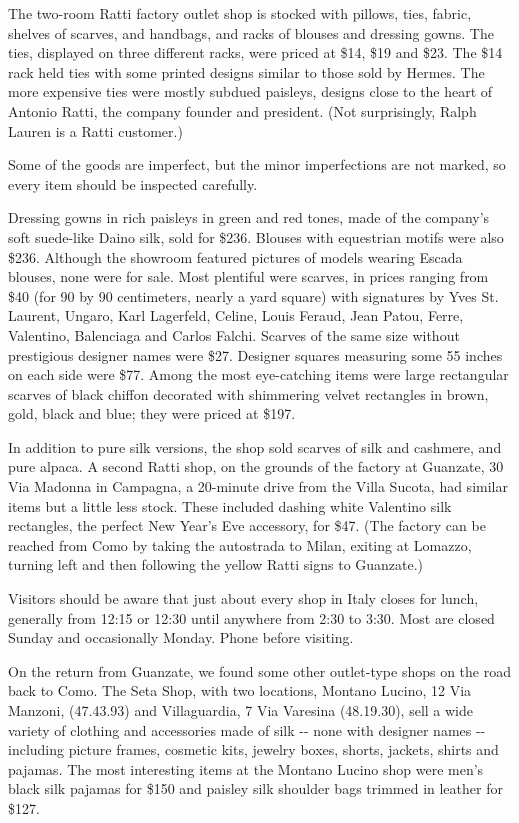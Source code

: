 The two-room Ratti factory outlet shop is stocked with pillows, ties,
fabric, shelves of scarves, and handbags, and racks of blouses and
dressing gowns. The ties, displayed on three different racks, were
priced at \$14, \$19 and \$23. The \$14 rack held ties with some printed
designs similar to those sold by Hermes. The more expensive ties were
mostly subdued paisleys, designs close to the heart of Antonio Ratti,
the company founder and president. (Not surprisingly, Ralph Lauren is a
Ratti customer.)

Some of the goods are imperfect, but the minor imperfections are not
marked, so every item should be inspected carefully.

Dressing gowns in rich paisleys in green and red tones, made of the
company's soft suede-like Daino silk, sold for \$236. Blouses with
equestrian motifs were also \$236. Although the showroom featured
pictures of models wearing Escada blouses, none were for sale. Most
plentiful were scarves, in prices ranging from \$40 (for 90 by 90
centimeters, nearly a yard square) with signatures by Yves St. Laurent,
Ungaro, Karl Lagerfeld, Celine, Louis Feraud, Jean Patou, Ferre,
Valentino, Balenciaga and Carlos Falchi. Scarves of the same size
without prestigious designer names were \$27. Designer squares measuring
some 55 inches on each side were \$77. Among the most eye-catching items
were large rectangular scarves of black chiffon decorated with
shimmering velvet rectangles in brown, gold, black and blue; they were
priced at \$197.

In addition to pure silk versions, the shop sold scarves of silk and
cashmere, and pure alpaca. A second Ratti shop, on the grounds of the
factory at Guanzate, 30 Via Madonna in Campagna, a 20-minute drive from
the Villa Sucota, had similar items but a little less stock. These
included dashing white Valentino silk rectangles, the perfect New Year's
Eve accessory, for \$47. (The factory can be reached from Como by taking
the autostrada to Milan, exiting at Lomazzo, turning left and then
following the yellow Ratti signs to Guanzate.)

Visitors should be aware that just about every shop in Italy closes for
lunch, generally from 12:15 or 12:30 until anywhere from 2:30 to 3:30.
Most are closed Sunday and occasionally Monday. Phone before visiting.

On the return from Guanzate, we found some other outlet-type shops on
the road back to Como. The Seta Shop, with two locations, Montano
Lucino, 12 Via Manzoni, (47.43.93) and Villaguardia, 7 Via Varesina
(48.19.30), sell a wide variety of clothing and accessories made of silk
-\/- none with designer names -\/- including picture frames, cosmetic
kits, jewelry boxes, shorts, jackets, shirts and pajamas. The most
interesting items at the Montano Lucino shop were men's black silk
pajamas for \$150 and paisley silk shoulder bags trimmed in leather for
\$127.

